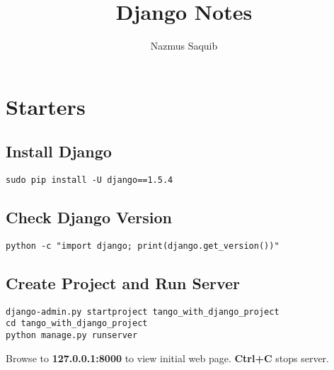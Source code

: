 \documentclass[10pt, a4paper]{article}
\begin{document}
\title{Django Notes}
\author{Nazmus Saquib}

\maketitle
\tableofcontents

\section{Starters}
\subsection{Install Django}
\begin{verbatim}
sudo pip install -U django==1.5.4
\end{verbatim}
\subsection{Check Django Version}
\begin{verbatim}
python -c "import django; print(django.get_version())"
\end{verbatim}
\subsection{Create Project and Run Server}
\begin{verbatim}
django-admin.py startproject tango_with_django_project
cd tango_with_django_project
python manage.py runserver
\end{verbatim}
Browse to \textbf{127.0.0.1:8000} to view initial web page.
\textbf{Ctrl+C} stops server.
\end{document}
